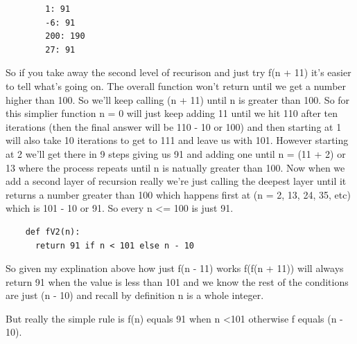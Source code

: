 \documentclass{article}
\begin{document}
\begin{enumerate}
\begin{lstlisting}
        1: 91
        -6: 91
        200: 190
        27: 91            
  \end{lstlisting}

  So if you take away the second level of recurison and just try f(n + 11) it's easier to tell what's going on. The overall function won't return until we get a number higher than 100. So we'll keep calling (n + 11) until n is greater than 100. So for this simplier function n = 0 will just keep adding 11 until we hit 110 after ten iterations (then the final answer will be 110 - 10 or 100) and then starting at 1 will also take 10 iterations to get to 111 and leave us with 101. However starting at 2 we'll get there in 9 steps giving us 91 and adding one until n = (11 + 2) or 13 where the process repeats until n is natually greater than 100. Now when we add a second layer of recursion really we're just calling the deepest layer until it returns a number greater than 100 which happens first at (n = 2, 13, 24, 35, etc) which is 101 - 10 or 91. So every n <= 100 is just 91.

  \begin{lstlisting}
    def fV2(n):
      return 91 if n < 101 else n - 10        
  \end{lstlisting}

  So given my explination above how just f(n - 11) works f(f(n + 11)) will always return 91 when the value is less than 101 and we know the rest of the conditions are just (n - 10) and recall by definition n is a whole integer.

  But really the simple rule is f(n) equals 91 when n \textless 101 otherwise f equals (n - 10).


\end{enumerate}
\end{document}
